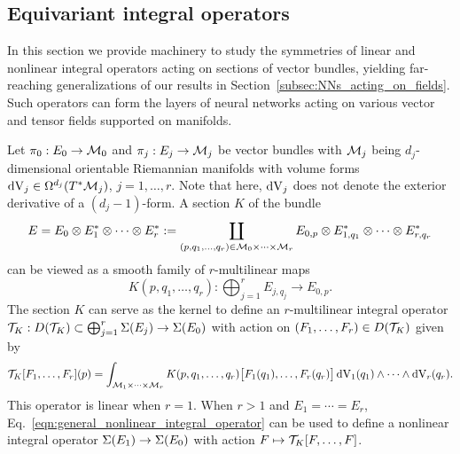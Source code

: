 \documentclass[twoside,11pt]{article}
\begin{document}
\subsection{Equivariant integral operators}
\label{subsec:equivariant_integral_operators}
In this section we provide machinery to study the symmetries of linear and nonlinear integral operators acting on sections of vector bundles, yielding far-reaching generalizations of our results in Section~\ref{subsec:NNs_acting_on_fields}.
Such operators can form the layers of neural networks acting on various vector and tensor fields supported on manifolds.

Let $\pi_0: E_0 \to {\mathcal{M}}_0$ and $\pi_j: E_j \to {\mathcal{M}}_j$ be vector bundles with ${\mathcal{M}}_j$ being $d_j$-dimensional orientable Riemannian manifolds with volume forms $\operatorname{dV}_j \in \Omega^{d_j}(T^*{\mathcal{M}}_j)$, $j=1,\ldots,r$.
Note that here, $\operatorname{dV}_j$ does not denote the exterior derivative of a $(d_j-1)$-form.
A section $K$ of the bundle 
\begin{equation}
    E = E_0 \otimes E_1^* \otimes \cdots \otimes E_r^*
    := \coprod_{(p,q_1, \ldots, q_r)\in{\mathcal{M}}_0\times\cdots\times{\mathcal{M}}_r} E_{0,p} \otimes E_{1,q_1}^* \otimes \cdots \otimes E_{r,q_r}^*
\end{equation}
can be viewed as a smooth family of $r$-multilinear maps
\begin{equation}
    K(p,q_1,\ldots,q_r):\bigoplus_{j=1}^r E_{j,q_j} \to E_{0,p}.
\end{equation}
The section $K$ can serve as the kernel to define an $r$-multilinear integral operator ${\mathcal{T}}_K : D({\mathcal{T}}_K) \subset \bigoplus_{j=1}^r\operatorname{\Sigma}(E_j) \to \operatorname{\Sigma}(E_0)$ with action on $(F_1,\ldots,F_r)\in D({\mathcal{T}}_K)$ given by
\begin{equation}
    {\mathcal{T}}_K[F_1,\ldots,F_r](p) = \int_{{\mathcal{M}}_1\times\cdots\times{\mathcal{M}}_r} K(p,q_1,\ldots,q_r)\big[ F_1(q_1), \ldots, F_r(q_r) \big] \operatorname{dV}_1(q_1) \wedge \cdots \wedge \operatorname{dV}_r(q_r). 
    \label{eqn:general_nonlinear_integral_operator}
\end{equation}
This operator is linear when $r=1$.
When $r > 1$ and $E_1 = \cdots = E_r$, Eq.~\ref{eqn:general_nonlinear_integral_operator} can be used to define a nonlinear integral operator $\operatorname{\Sigma}(E_1) \to \operatorname{\Sigma}(E_0)$ with action $F \mapsto {\mathcal{T}}_K[F,\ldots,F]$.
\end{document}
